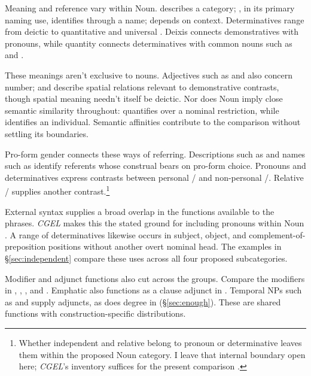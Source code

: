 \documentclass[12pt]{article}
\begin{document}
Meaning and reference vary within Noun.  describes a category; , in its primary naming use, identifies through a name;  depends on context. Determinatives range from deictic  to quantitative  and universal  \citep[358--360, 370--405, 425--428, 515--521]{huddleston2002}. Deixis connects demonstratives with pronouns, while quantity connects determinatives with common nouns such as  and .

These meanings aren't exclusive to nouns. Adjectives such as  and  also concern number;  and  describe spatial relations relevant to demonstrative contrasts, though spatial meaning needn't itself be deictic. Nor does Noun imply close semantic similarity throughout:  quantifies over a nominal restriction, while  identifies an individual. Semantic affinities contribute to the comparison without settling its boundaries.

Pro-form gender \citep{reynolds2025proformgender} connects these ways of referring. Descriptions such as  and names such as  identify referents whose construal bears on pro-form choice. Pronouns and determinatives express contrasts between personal / and non-personal /. Relative / supplies another contrast.\footnote{Whether independent  and relative  belong to pronoun or determinative leaves them within the proposed Noun category. I leave that internal boundary open here; \textit{CGEL}'s inventory suffices for the present comparison \citep[397--399]{huddleston2002}.}

External syntax supplies a broad overlap in the functions available to the phrases. \textit{CGEL} makes this the stated ground for including pronouns within Noun \citep[327]{huddleston2002}. A range of determinatives likewise occurs in subject, object, and complement-of-preposition positions without another overt nominal head. The examples in §\ref{sec:independent} compare these uses across all four proposed subcategories.

Modifier and adjunct functions also cut across the groups. Compare the modifiers in , , , and . Emphatic  also functions as a clause adjunct in  \citep[1496--1497]{huddleston2002}. Temporal NPs such as  and  supply adjuncts, as does degree  in  (§\ref{sec:enough}). These are shared functions with construction-specific distributions.
\end{document}

